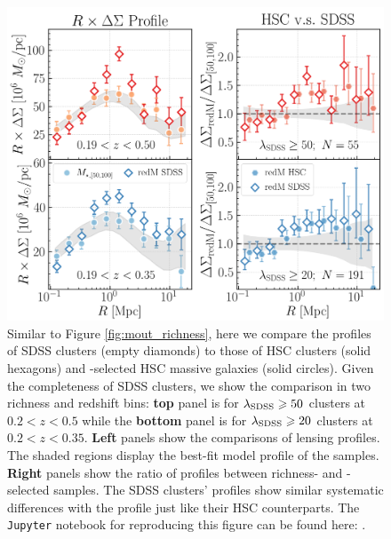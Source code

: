 \documentclass[fleqn,usenatbib,useAMS]{mnras}
\begin{document}
\begin{figure}
    \centering
    \includegraphics[width=\columnwidth]{figure/fig_F1}
    \caption{
        Similar to Figure \ref{fig:mout_richness}, here we compare the \dsigma{} profiles of
        SDSS \redm{} clusters (empty diamonds) to those of HSC \redm{} clusters (solid hexagons)
        and -selected HSC massive galaxies (solid circles). 
        Given the completeness of SDSS \redm{} clusters, we show the comparison in two richness
        and redshift bins: \textbf{top} panel is for $\lambda_{\rm SDSS} \geq 50$ clusters at
        $0.2 < z < 0.5$ while the \textbf{bottom} panel is for $\lambda_{\rm SDSS} \geq 20$
        clusters at $0.2 < z < 0.35$.
        \textbf{Left} panels show the comparisons of lensing profiles. 
        The shaded regions display the best-fit model profile of the  samples.
        \textbf{Right} panels show the ratio of \dsigma{} profiles between richness- and 
        -selected samples.
        The SDSS \redm{} clusters' \dsigma{} profiles show similar systematic differences 
        with the  profile just like their HSC counterparts.
        The \texttt{Jupyter} notebook for reproducing this figure can be found here:
        \href{https://github.com/dr-guangtou/jianbing/blob/master/notebooks/figure/figF1.ipynb}{\faGithub}.
    }
    \label{fig:sdss_redm}
\end{figure}
\end{document}
